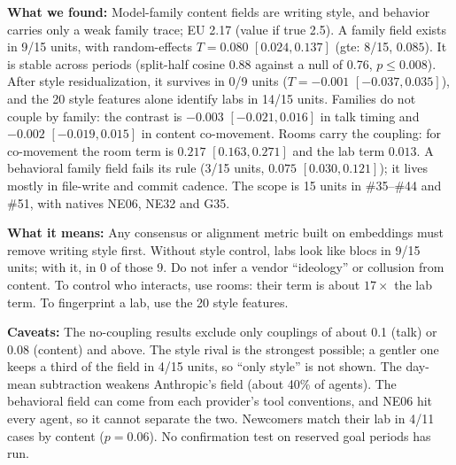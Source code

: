\textbf{What we found:} Model-family content fields are writing style, and behavior carries only a weak family trace; EU 2.17 (value if true 2.5). A family field exists in 9/15 units, with random-effects $T=0.080$ $[0.024, 0.137]$ (gte: 8/15, $0.085$). It is stable across periods (split-half cosine 0.88 against a null of 0.76, $p\le0.008$). After style residualization, it survives in 0/9 units ($T=-0.001$ $[-0.037, 0.035]$), and the 20 style features alone identify labs in 14/15 units. Families do not couple by family: the contrast is $-0.003$ $[-0.021, 0.016]$ in talk timing and $-0.002$ $[-0.019, 0.015]$ in content co-movement. Rooms carry the coupling: for co-movement the room term is $0.217$ $[0.163, 0.271]$ and the lab term $0.013$. A behavioral family field fails its rule (3/15 units, $0.075$ $[0.030, 0.121]$); it lives mostly in file-write and commit cadence. The scope is 15 units in \#35--\#44 and \#51, with natives NE06, NE32 and G35.

\textbf{What it means:} Any consensus or alignment metric built on embeddings must remove writing style first. Without style control, labs look like blocs in 9/15 units; with it, in 0 of those 9. Do not infer a vendor ``ideology'' or collusion from content. To control who interacts, use rooms: their term is about $17\times$ the lab term. To fingerprint a lab, use the 20 style features.

\textbf{Caveats:} The no-coupling results exclude only couplings of about 0.1 (talk) or 0.08 (content) and above. The style rival is the strongest possible; a gentler one keeps a third of the field in 4/15 units, so ``only style'' is not shown. The day-mean subtraction weakens Anthropic's field (about 40\% of agents). The behavioral field can come from each provider's tool conventions, and NE06 hit every agent, so it cannot separate the two. Newcomers match their lab in 4/11 cases by content ($p=0.06$). No confirmation test on reserved goal periods has run.
